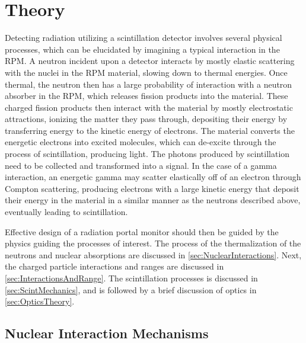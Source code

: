 \chapter{Theory}
\label{chap:theory}
Detecting radiation utilizing a scintillation detector involves several physical processes, which can be elucidated by imagining a typical interaction in the RPM.
A neutron incident upon a detector interacts by mostly elastic scattering with the nuclei in the RPM material, slowing down to thermal energies.
Once thermal, the neutron then has a large probability of interaction with a neutron absorber in the RPM, which releases fission products into the material.
These charged fission products then interact with the material by mostly electrostatic attractions, ionizing the matter they pass through, depositing their energy by transferring  energy to the kinetic energy of electrons.
The material converts the energetic electrons into excited molecules, which can de-excite through the process of scintillation, producing light.
The photons produced by scintillation need to be collected and transformed into a signal.
In the case of a gamma interaction, an energetic gamma may scatter elastically off of an electron through Compton scattering, producing electrons with a large kinetic energy that deposit their energy in the material in a similar manner as the neutrons described above, eventually leading to scintillation.

Effective design of a radiation portal monitor should then be guided by the physics guiding the processes of interest.
The process of the thermalization of the neutrons and nuclear absorptions are discussed in \autoref{sec:NuclearInteractions}.
Next, the charged particle interactions and ranges are discussed in \autoref{sec:InteractionsAndRange}.
The scintillation processes is discussed in \autoref{sec:ScintMechanics}, and is followed by a brief discussion of optics in \autoref{sec:OpticsTheory}.

 
\section{Nuclear Interaction Mechanisms}
\label{sec:NuclearInteractions}



